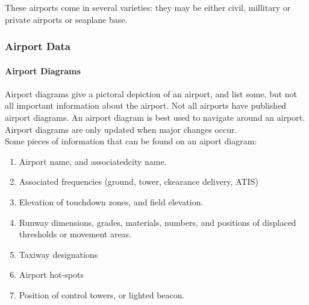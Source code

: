 \documentclass[12pt]{article}
\begin{document}
			These airports come in several varieties: they may be either civil, millitary or private airports or seaplane base.
		\subsubsection{Airport Data}
			\paragraph{Airport Diagrams}
				Airport diagrams give a pictoral depiction of an airport, and list some, but not all important information about the airport. Not all airports have published airport diagrams. An airport diagram is best used to navigate around an airport. Airport diagrams are only updated when major changes occur.\\
				Some pieces of information that can be found on an aiport diagram:
				\begin{multicols}{2}
				\begin{enumerate}
					\item Airport name, and associatedcity name.
					\item Associated frequencies (ground, tower, ckearance delivery, ATIS)
					\item Elevation of touchdown zones, and field elevation.
					\item Runway dimensions, grades, materials, numbers, and positions of displaced thresholds or movement areas. 
					\item Taxiway designations
					\item Airport hot-spots
					\item Position of control towers, or lighted beacon.
				\end{enumerate}
				\end{multicols}
\end{document}
